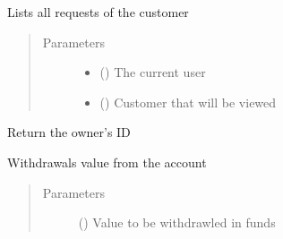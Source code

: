 \documentclass[letterpaper,10pt,english]{sphinxmanual}
\begin{document}

\begin{fulllineitems}
\label{\detokenize{sample:sample.terminalFunctions.requests}}
Lists all requests of the customer
\begin{quote}\begin{description}
\item[{Parameters}] \leavevmode\begin{itemize}
\item {} 
 () \textendash{} The current user

\item {} 
 () \textendash{} Customer that will be viewed

\end{itemize}

\end{description}\end{quote}

\end{fulllineitems}


\begin{fulllineitems}
\label{\detokenize{sample:sample.terminalFunctions.whoami}}
Return the owner’s ID

\end{fulllineitems}


\begin{fulllineitems}
\label{\detokenize{sample:sample.terminalFunctions.withdrawal}}
Withdrawals value from the account
\begin{quote}\begin{description}
\item[{Parameters}] \leavevmode
{} () \textendash{} Value to be withdrawled in funds

\end{description}\end{quote}

\end{fulllineitems}
\end{document}
